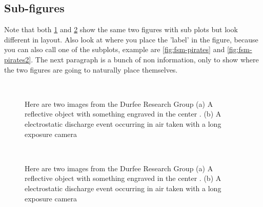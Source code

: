 \subsection{Sub-figures}

Note that both \ref{fig:fsm} and \ref{fig:fsm-2} show the same two figures with sub plots but look different in layout. Also look at where you place the 'label' in the figure, because you can also call one of the subplots, example are \ref{fig:fsm-pirates} and \ref{fig:fsm-pirates2}. The next paragraph is a bunch of non information, only to show where the two figures are going to naturally place themselves. 

\begin{figure}
	\centering
		 \\
		\caption{\label{fig:fsm} Here are two images from the Durfee Research Group (a) A reflective object with something engraved in the center \cite{cite-schrama_2019-blue}. (b) A electrostatic discharge event occurring in air taken with a long exposure camera  \cite{cite-schrama_2019}}
\end{figure}

\lipsum[3]

\lipsum[4]

\begin{figure}[ht]
	\centering
		 ~

		\caption{\label{fig:fsm-2} Here are two images from the Durfee Research Group (a) A reflective object with something engraved in the center \cite{cite-schrama_2019-blue}. (b) A electrostatic discharge event occurring in air taken with a long exposure camera  \cite{cite-schrama_2019}}
\end{figure}


